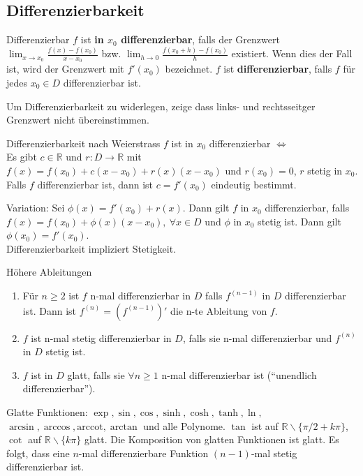 \documentclass[a4paper,10pt]{article}
\def\R{\mathbb{R}}
\begin{document}
\subsection{Differenzierbarkeit}
\begin{mainbox}{Differenzierbar}
 $f$ ist \textbf{in $x_0$ differenzierbar}, falls der Grenzwert $\lim_{x\to x_0} \frac{f(x) - f(x_0)}{x - x_0}$ bzw. $\lim_{h \to 0} \frac{f(x_0 + h) - f(x_0)}{h}$ existiert. Wenn dies der Fall ist, wird der Grenzwert mit $f'(x_0)$ bezeichnet. $f$ ist \textbf{differenzierbar}, falls $f$ für jedes $x_0 \in D$ differenzierbar ist.
\end{mainbox}
Um Differenzierbarkeit zu widerlegen, zeige dass links- und rechtsseitger Grenzwert nicht übereinstimmen.
\begin{subbox}{Differenzierbarkeit nach Weierstrass}
 $f$ ist in $x_0$ differenzierbar $\iff$ \\
 Es gibt $c \in \R$ und $r: D \to \R$ mit $f(x) = f(x_0) + c(x - x_0) + r(x) (x - x_0)$ und $r(x_0) = 0$, $r$ stetig in $x_0$. \\
 Falls $f$ differenzierbar ist, dann ist $c = f'(x_0)$ eindeutig bestimmt.
\end{subbox}
Variation: Sei $\phi(x) = f'(x_0) + r(x)$. Dann gilt $f$ in $x_0$ differenzierbar, falls $f(x) = f(x_0) + \phi(x) (x-x_0), \ \forall x \in D$ und $\phi$ in $x_0$ stetig ist.
Dann gilt $\phi(x_0) = f'(x_0)$.\\
Differenzierbarkeit impliziert Stetigkeit.

\begin{mainbox}{Höhere Ableitungen}
 \begin{enumerate}
  \item Für $n \ge 2$ ist $f$ n-mal differenzierbar in $D$ falls $f^{(n-1)}$ in $D$ differenzierbar ist. Dann ist $f^{(n)} = (f^{(n-1)})'$ die n-te Ableitung von $f$.
  \item $f$ ist n-mal stetig differenzierbar in $D$, falls sie n-mal differenzierbar und $f^{(n)}$ in $D$ stetig ist.
  \item $f$ ist in $D$ glatt, falls sie $\forall n \ge 1$ n-mal differenzierbar ist (``unendlich differenzierbar'').
 \end{enumerate}
\end{mainbox}
Glatte Funktionen: $\exp, \sin, \cos, \sinh, \cosh, \tanh, \ln,$\\ $ \arcsin, \arccos, \text{arccot}, \arctan$ und alle Polynome. $\tan$ ist auf $\R \backslash \{\pi/2 + k\pi\}$, $\cot$ auf $\R \backslash \{k\pi\}$ glatt. Die Komposition von glatten Funktionen ist glatt. Es folgt, dass eine $n$-mal differenzierbare Funktion $(n-1)$-mal stetig differenzierbar ist.
\end{document}
